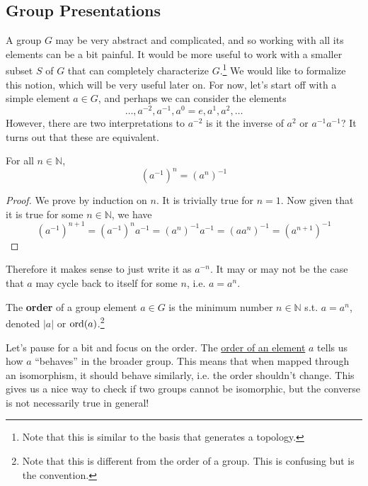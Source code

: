 \subsection{Group Presentations} 

  A group $G$ may be very abstract and complicated, and so working with all its elements can be a bit painful. It would be more useful to work with a smaller subset $S$ of $G$ that can completely characterize $G$.\footnote{Note that this is similar to the basis that generates a topology.} We would like to formalize this notion, which will be very useful later on. For now, let's start off with a simple element $a \in G$, and perhaps we can consider the elements 
  \begin{equation}
    \ldots, a^{-2}, a^{-1}, a^0 = e, a^1, a^2, \ldots
  \end{equation}
  However, there are two interpretations to $a^{-2}$ is it the inverse of $a^2$ or $a^{-1} a^{-1}$? It turns out that these are equivalent. 

  \begin{lemma}
    \label{thm:power-to-an-integer-is-well-defined}
    For all $n \in \mathbb{N}$, 
    \begin{equation}
      (a^{-1})^n = (a^n)^{-1}
    \end{equation}
  \end{lemma}
  \begin{proof}
    We prove by induction on $n$. It is trivially true for $n=1$. Now given that it is true for some $n \in \mathbb{N}$, we have 
    \begin{equation}
      (a^{-1})^{n+1} = (a^{-1})^n a^{-1} = (a^n)^{-1} a^{-1} = (a a^n)^{-1} = (a^{n+1})^{-1}
    \end{equation}
  \end{proof}

  Therefore it makes sense to just write it as $a^{-n}$. It may or may not be the case that $a$ may cycle back to itself for some $n$, i.e. $a = a^n$. 

  \begin{definition}
    \label{def:order-of-an-element}
    The \textbf{order} of a group element $a \in G$ is the minimum number $n \in \mathbb{N}$ s.t. $a = a^n$, denoted $|a|$ or $\operatorname{ord}(a)$.\footnote{Note that this is different from the order of a group. This is confusing but is the convention. }
  \end{definition} 

  Let's pause for a bit and focus on the order. The \hyperref[def:order-of-an-element]{order of an element} $a$ tells us how $a$ ``behaves'' in the broader group. This means that when mapped through an isomorphism, it should behave similarly, i.e. the order shouldn't change. This gives us a nice way to check if two groups cannot be isomorphic, but the converse is not necessarily true in general! 

